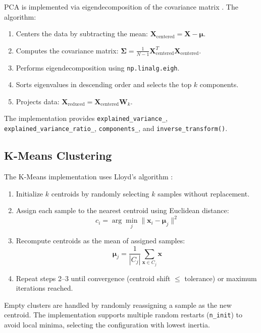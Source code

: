 \documentclass[conference,12pt]{IEEEtran}
\begin{document}
PCA is implemented via eigendecomposition of the covariance matrix \cite{jolliffe2002pca}. The algorithm:
\begin{enumerate}
    \item Centers the data by subtracting the mean: $\mathbf{X}_{\text{centered}} = \mathbf{X} - \boldsymbol{\mu}$.
    \item Computes the covariance matrix: $\boldsymbol{\Sigma} = \frac{1}{N-1} \mathbf{X}_{\text{centered}}^T \mathbf{X}_{\text{centered}}$.
    \item Performs eigendecomposition using \texttt{np.linalg.eigh}.
    \item Sorts eigenvalues in descending order and selects the top $k$ components.
    \item Projects data: $\mathbf{X}_{\text{reduced}} = \mathbf{X}_{\text{centered}} \mathbf{W}_k$.
\end{enumerate}

The implementation provides \texttt{explained\_variance\_}, \texttt{explained\_variance\_ratio\_}, \texttt{components\_}, and \texttt{inverse\_transform()}.

\subsection{K-Means Clustering}

The K-Means implementation uses Lloyd's algorithm \cite{lloyd1982least}:
\begin{enumerate}
    \item Initialize $k$ centroids by randomly selecting $k$ samples without replacement.
    \item Assign each sample to the nearest centroid using Euclidean distance:
    \begin{equation}
    c_i = \arg\min_{j} \|\mathbf{x}_i - \boldsymbol{\mu}_j\|^2
    \end{equation}
    \item Recompute centroids as the mean of assigned samples:
    \begin{equation}
    \boldsymbol{\mu}_j = \frac{1}{|C_j|} \sum_{\mathbf{x} \in C_j} \mathbf{x}
    \end{equation}
    \item Repeat steps 2--3 until convergence (centroid shift $\leq$ tolerance) or maximum iterations reached.
\end{enumerate}

Empty clusters are handled by randomly reassigning a sample as the new centroid. The implementation supports multiple random restarts (\texttt{n\_init}) to avoid local minima, selecting the configuration with lowest inertia.
\end{document}
